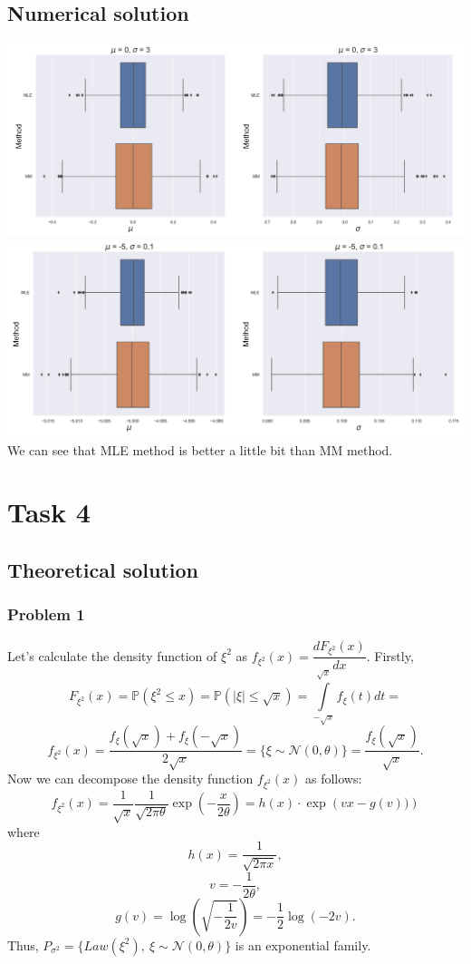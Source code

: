 \documentclass[a4paper, 12pt]{article}
\renewcommand*{\P}{\mathbb{P}}
\begin{document}
\subsection{Numerical solution}
\includegraphics[width=\textwidth]{Images/Task3.png}
\includegraphics[width=\textwidth]{Images/Task3_1.png}
We can see that MLE method is better a little bit than MM method.


\section{Task 4}
\subsection{Theoretical solution}
\subsubsection{Problem 1}
Let's calculate the density function of $\xi^2$ as $f_{\xi^2}(x) = \dfrac{dF_{\xi^2}(x)}{dx}.$ Firstly,
$$
F_{\xi^2}(x) = \P(\xi^2 \leqslant x) =  \P(|\xi | \leqslant \sqrt{x}) = \int \limits_{-\sqrt{x}}^{\sqrt{x}} f_{\xi}(t) dt = 
$$
$$
f_{\xi^2}(x) = \dfrac{f_{\xi}(\sqrt{x}) + f_{\xi}(-\sqrt{x})}{2 \sqrt{x}} = \{ \xi \sim \mathcal{N}(0, \theta)\} = \dfrac{f_{\xi}(\sqrt{x})}{\sqrt{x}}.
$$
Now we can decompose the density function $f_{\xi^2}(x)$ as follows:
$$
f_{\xi^2}(x) = \dfrac{1}{\sqrt{x}} \dfrac{1}{\sqrt{2 \pi  \theta}} \exp \left( -\dfrac{x}{2 \theta} \right) = h(x) \cdot \exp \left(v x - g(v)) \right)
$$
where
$$
h(x) = \dfrac{1}{\sqrt{2 \pi x}},
$$
$$
v = -\dfrac{1}{2  \theta},
$$
$$
g(v) = \log \left (\sqrt{-\dfrac{1}{2v}} \right) = -\dfrac{1}{2} \log (-2v).
$$
Thus, $P_{\sigma^2} = \{Law(\xi^2), ~ \xi \sim \mathcal{N}(0, \theta) \}$ is an exponential family.
\end{document}
